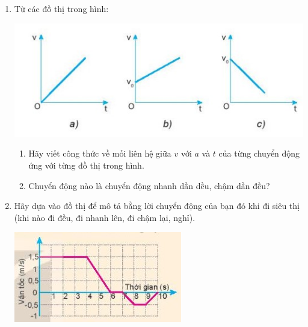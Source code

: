 \begin{enumerate}[label=\bfseries Câu \arabic*:]
	\item {}
	
	{ Từ các đồ thị trong hình:
		\begin{center}
			\includegraphics[scale=1]{../figs/VN10-2022-PH-TP012-1.jpg}
		\end{center}
		
		\begin{enumerate}[label=\alph*)]
			\item Hãy viết công thức về mối liên hệ giữa $v$ với $a$ và $t$ của từng chuyển động ứng với từng đồ thị trong hình.
			\item Chuyển động nào là chuyển động nhanh dần dều, chậm dần đều?
		\end{enumerate}
		
	}
	
		\item {}
	
	{ Hãy dựa vào đồ thị để mô tả bằng lời chuyển động của bạn đó khi đi siêu thị (khi nào đi đều, đi nhanh lên, đi chậm lại, nghỉ).
		\begin{center}
			\includegraphics[scale=1]{../figs/VN10-2022-PH-TP012-2.jpg}
		\end{center}
		
}
\end{enumerate}
